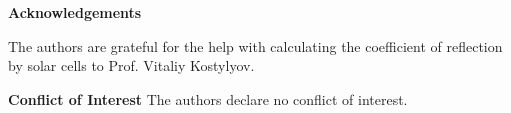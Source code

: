 \documentclass{WileyMSP-template}
\begin{document}
\medskip
\textbf{Acknowledgements} \par %
The authors are grateful for the help with calculating the coefficient of reflection by solar cells to Prof. Vitaliy Kostylyov.

\medskip
\textbf{Conflict of Interest}
The authors declare no conflict of interest.

\medskip








\end{document}

